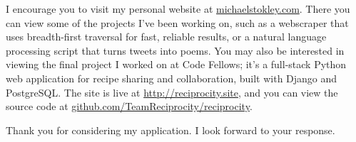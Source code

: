 \documentclass[10pt,a4paper,sans]{moderncv}        %
\begin{document}
I encourage you to visit my personal
website at {\href{http://michaelstokley.com}{michaelstokley.com}}. There
you can view some of the projects I've been working on, such as a webscraper
that uses breadth-first traversal for fast, reliable results, or a natural
language processing script that turns tweets into poems. You may also be
interested in viewing the final project I worked on at Code Fellows; it's a
full-stack Python web application for recipe sharing and collaboration, built
with Django and PostgreSQL. The site is live at
{\href{http://reciprocity.site.}{http://reciprocity.site}}, and you can view the
source code at {\href{http://github.com/TeamReciprocity/reciprocity}{github.com/TeamReciprocity/reciprocity}}.

Thank you for considering my application. I look forward to your response.

\makeletterclosing
\end{document}
